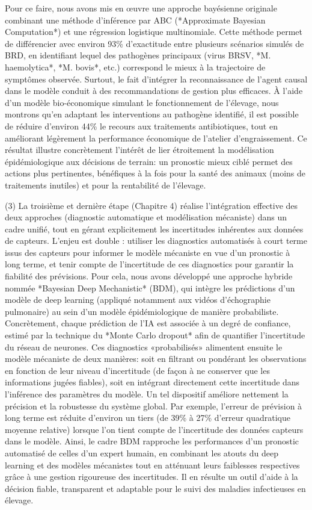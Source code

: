 Pour ce faire, nous avons mis en œuvre une approche bayésienne originale combinant une méthode d’inférence par ABC (*Approximate Bayesian Computation*) et une régression logistique multinomiale. Cette méthode permet de différencier avec environ 93\% d’exactitude entre plusieurs scénarios simulés de BRD, en identifiant lequel des pathogènes principaux (virus BRSV, *M. haemolytica*, *M. bovis*, etc.) correspond le mieux à la trajectoire de symptômes observée. Surtout, le fait d’intégrer la reconnaissance de l’agent causal dans le modèle conduit à des recommandations de gestion plus efficaces. À l’aide d’un modèle bio-économique simulant le fonctionnement de l’élevage, nous montrons qu’en adaptant les interventions au pathogène identifié, il est possible de réduire d’environ 44\% le recours aux traitements antibiotiques, tout en améliorant légèrement la performance économique de l’atelier d’engraissement. Ce résultat illustre concrètement l’intérêt de lier étroitement la modélisation épidémiologique aux décisions de terrain: un pronostic mieux ciblé permet des actions plus pertinentes, bénéfiques à la fois pour la santé des animaux (moins de traitements inutiles) et pour la rentabilité de l’élevage.

(3) La troisième et dernière étape (Chapitre 4) réalise l’intégration effective des deux approches (diagnostic automatique et modélisation mécaniste) dans un cadre unifié, tout en gérant explicitement les incertitudes inhérentes aux données de capteurs. L’enjeu est double : utiliser les diagnostics automatisés à court terme issus des capteurs pour informer le modèle mécaniste en vue d’un pronostic à long terme, et tenir compte de l’incertitude de ces diagnostics pour garantir la fiabilité des prévisions. Pour cela, nous avons développé une approche hybride nommée *Bayesian Deep Mechanistic* (BDM), qui intègre les prédictions d’un modèle de deep learning (appliqué notamment aux vidéos d’échographie pulmonaire) au sein d’un modèle épidémiologique de manière probabiliste. Concrètement, chaque prédiction de l’IA est associée à un degré de confiance, estimé par la technique du *Monte Carlo dropout* afin de quantifier l’incertitude du réseau de neurones. Ces diagnostics «probabilisés» alimentent ensuite le modèle mécaniste de deux manières: soit en filtrant ou pondérant les observations en fonction de leur niveau d’incertitude (de façon à ne conserver que les informations jugées fiables), soit en intégrant directement cette incertitude dans l’inférence des paramètres du modèle. Un tel dispositif améliore nettement la précision et la robustesse du système global. Par exemple, l’erreur de prévision à long terme est réduite d’environ un tiers (de 39\% à 27\% d’erreur quadratique moyenne relative) lorsque l’on tient compte de l’incertitude des données capteurs dans le modèle. Ainsi, le cadre BDM rapproche les performances d’un pronostic automatisé de celles d’un expert humain, en combinant les atouts du deep learning et des modèles mécanistes tout en atténuant leurs faiblesses respectives grâce à une gestion rigoureuse des incertitudes. Il en résulte un outil d’aide à la décision fiable, transparent et adaptable pour le suivi des maladies infectieuses en élevage.

